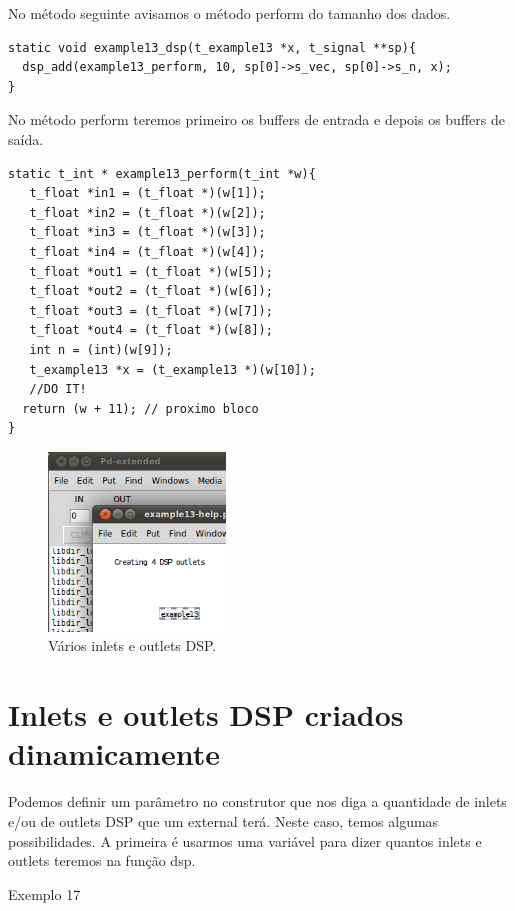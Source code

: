 \documentclass[10pt,a4paper]{report}
\begin{document}
No método seguinte avisamos o método perform do tamanho dos dados.
\begin{lstlisting}
static void example13_dsp(t_example13 *x, t_signal **sp){
  dsp_add(example13_perform, 10, sp[0]->s_vec, sp[0]->s_n, x);
}
\end{lstlisting}

No método perform teremos primeiro os buffers de entrada e depois os buffers de saída.

\begin{lstlisting}
static t_int * example13_perform(t_int *w){
   t_float *in1 = (t_float *)(w[1]);
   t_float *in2 = (t_float *)(w[2]);
   t_float *in3 = (t_float *)(w[3]);
   t_float *in4 = (t_float *)(w[4]);
   t_float *out1 = (t_float *)(w[5]);
   t_float *out2 = (t_float *)(w[6]);
   t_float *out3 = (t_float *)(w[7]);
   t_float *out4 = (t_float *)(w[8]);
   int n = (int)(w[9]);
   t_example13 *x = (t_example13 *)(w[10]);
   //DO IT!
  return (w + 11); // proximo bloco
}
\end{lstlisting}

\begin{figure}[h!]
	\centering
	\includegraphics[height=180]{./images/example13}
	\caption{Vários inlets e outlets DSP.}
\end{figure}

\section{Inlets e outlets DSP criados dinamicamente}

Podemos definir um parâmetro no construtor que nos diga a quantidade de inlets e/ou de outlets DSP que um external terá. Neste caso, temos algumas possibilidades. A primeira é usarmos uma variável para dizer quantos inlets e outlets teremos na função dsp.

Exemplo 17
\end{document}

